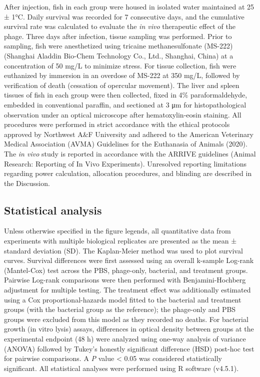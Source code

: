 \documentclass[11pt,a4paper]{article}
\begin{document}
After injection, fish in each group were housed in isolated water
maintained at 25 ± 1°C. Daily survival was recorded for 7 consecutive
days, and the cumulative survival rate was calculated to evaluate the
\emph{in vivo} therapeutic effect of the phage. Three days after
infection, tissue sampling was performed. Prior to sampling, fish were
anesthetized using tricaine methanesulfonate (MS-222) (Shanghai Aladdin
Bio-Chem Technology Co., Ltd., Shanghai, China) at a concentration of 50
mg/L to minimize stress. For tissue collection, fish were euthanized by
immersion in an overdose of MS-222 at 350 mg/L, followed by verification
of death (cessation of opercular movement). The liver and spleen tissues
of fish in each group were then collected, fixed in 4\%
paraformaldehyde, embedded in conventional paraffin, and sectioned at 3 μm
for histopathological observation under an optical microscope after
hematoxylin-eosin staining. All procedures were performed in strict
accordance with the ethical protocols approved by Northwest A\&F
University and adhered to the American Veterinary Medical Association
(AVMA) Guidelines for the Euthanasia of Animals (2020). The \emph{in
vivo} study is reported in accordance with the ARRIVE guidelines (Animal
Research: Reporting of In Vivo Experiments). Unresolved reporting
limitations regarding power calculation, allocation procedures, and blinding
are described in the Discussion.

\subsection{Statistical analysis}\label{statistical-analysis}

Unless otherwise specified in the figure legends, all quantitative data
from experiments with multiple biological replicates are presented as the mean ±
standard deviation (SD). The Kaplan-Meier method was used to plot
survival curves. Survival differences were first assessed using an
overall k-sample Log-rank (Mantel-Cox) test across the PBS, phage-only,
bacterial, and treatment groups. Pairwise Log-rank comparisons were then
performed with Benjamini-Hochberg adjustment for multiple testing. The
treatment effect was additionally estimated using a Cox
proportional-hazards model fitted to the bacterial and treatment groups
(with the bacterial group as the reference); the phage-only and PBS
groups were excluded from this model as they recorded no deaths. For bacterial growth (in
vitro lysis) assays, differences in optical density between groups at
the experimental endpoint (48 h) were analyzed using one-way analysis of
variance (ANOVA) followed by Tukey's honestly significant difference (HSD)
post-hoc test for pairwise comparisons. A \textit{P} value \textless{} 0.05 was
considered statistically significant. All statistical analyses were performed using
R software (v4.5.1).
\end{document}
